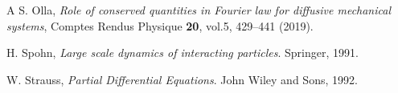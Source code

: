 \documentclass[EJP]{ejpecp} %
\numberwithin{equation}{section}
\begin{document}
\begin{thebibliography}{A}
 S. Olla, \emph{Role of conserved quantities in Fourier
    law for diffusive mechanical systems},
 Comptes Rendus Physique \textbf{20}, vol.5, 429--441 (2019).
 
%

 H. Spohn, \emph{Large scale dynamics of interacting particles}.
  Springer, 1991.

 W. Strauss, \emph{Partial Differential Equations}. John Wiley and Sons, 1992.

%
%

\end{thebibliography}
\end{document}
